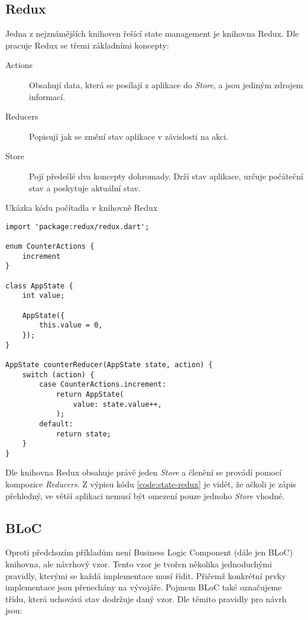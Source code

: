 \subsection{Redux}

Jedna z nejznámějších knihoven řešící state management je knihovna Redux.
Dle \cite{redux_basics} pracuje Redux se třemi základními koncepty:

\begin{description}
    \item[Actions] Obsahují data,
    která se posílají z aplikace do \emph{Store},
    a jsou jediným zdrojem informací.
    \item[Reducers] Popisují jak se změní stav aplikace v závislosti na akci.
    \item[Store] Pojí předešlé dva koncepty dohromady.
    Drží stav aplikace,
    určuje počáteční stav
    a poskytuje aktuální stav.
\end{description}

\begin{listing}
    \caption{Ukázka kódu počítadla v knihovně Redux \cite{redux_basics}}
    \label{code:state-redux}
    \begin{verbatim}
import 'package:redux/redux.dart';

enum CounterActions {
    increment
}

class AppState {
    int value;

    AppState({ 
        this.value = 0,
    });
}

AppState counterReducer(AppState state, action) {
    switch (action) {
        case CounterActions.increment:
            return AppState(
                value: state.value++,
            );
        default:
            return state;
    }
}
    \end{verbatim}
\end{listing}

Dle \cite{redux_basics} knihovna Redux obsahuje právě jeden \emph{Store}
a členění se provádí pomocí kompozice \emph{Reducers}.
Z výpisu kódu \ref{code:state-redux} je vidět,
že ačkoli je zápis přehledný,
ve větší aplikaci nemusí být omezení pouze jednoho \emph{Store} vhodné.

\subsection{BLoC}

Oproti předchozím příkladům není Business Logic Component (dále jen BLoC)
knihovna,
ale návrhový vzor.
Tento vzor je tvořen několika jednoduchými pravidly,
kterými se každá implementace musí řídit.
Přičemž konkrétní prvky implementace jsou přenechány na vývojáře.
Pojmem BLoC také označujeme třídu,
která uchovává stav dodržuje daný vzor. 
Dle \cite{googledevelopers_bloc} těmito pravidly pro návrh jsou:

